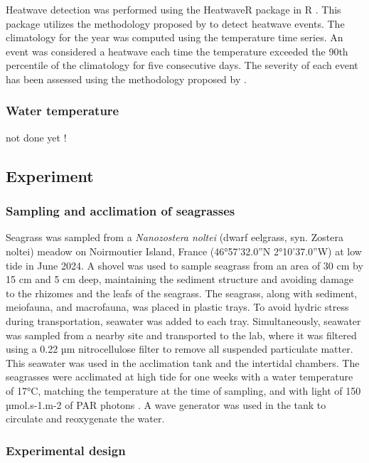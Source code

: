 \documentclass[
  number]{elsarticle}
\begin{document}
Heatwave detection was performed using the HeatwaveR package in R
\citep{heatwaveR}. This package utilizes the methodology proposed by
\citep{hobday2016hierarchical} to detect heatwave events. The
climatology for the year was computed using the temperature time series.
An event was considered a heatwave each time the temperature exceeded
the 90th percentile of the climatology for five consecutive days. The
severity of each event has been assessed using the methodology proposed
by \citep{hobday2018categorizing}.

\subsubsection{Water temperature}\label{water-temperature}

not done yet !

\subsection{Experiment}\label{experiment}

\subsubsection{Sampling and acclimation of
seagrasses}\label{sampling-and-acclimation-of-seagrasses}

Seagrass was sampled from a \emph{Nanozostera noltei} (dwarf eelgrass,
syn. Zostera noltei) meadow on Noirmoutier Island, France (46°57'32.0''N
2°10'37.0''W) at low tide in June 2024. A shovel was used to sample
seagrass from an area of 30 cm by 15 cm and 5 cm deep, maintaining the
sediment structure and avoiding damage to the rhizomes and the leafs of
the seagrass. The seagrass, along with sediment, meiofauna, and
macrofauna, was placed in plastic trays. To avoid hydric stress during
transportation, seawater was added to each tray. Simultaneously,
seawater was sampled from a nearby site and transported to the lab,
where it was filtered using a 0.22 µm nitrocellulose filter to remove
all suspended particulate matter. This seawater was used in the
acclimation tank and the intertidal chambers. The seagrasses were
acclimated at high tide for one weeks with a water temperature of 17°C,
matching the temperature at the time of sampling, and with light of 150
µmol.s-1.m-2 of PAR photons \citep{akbar2020mangrove}. A wave generator
was used in the tank to circulate and reoxygenate the water.

\subsubsection{Experimental design}\label{experimental-design}
\end{document}
